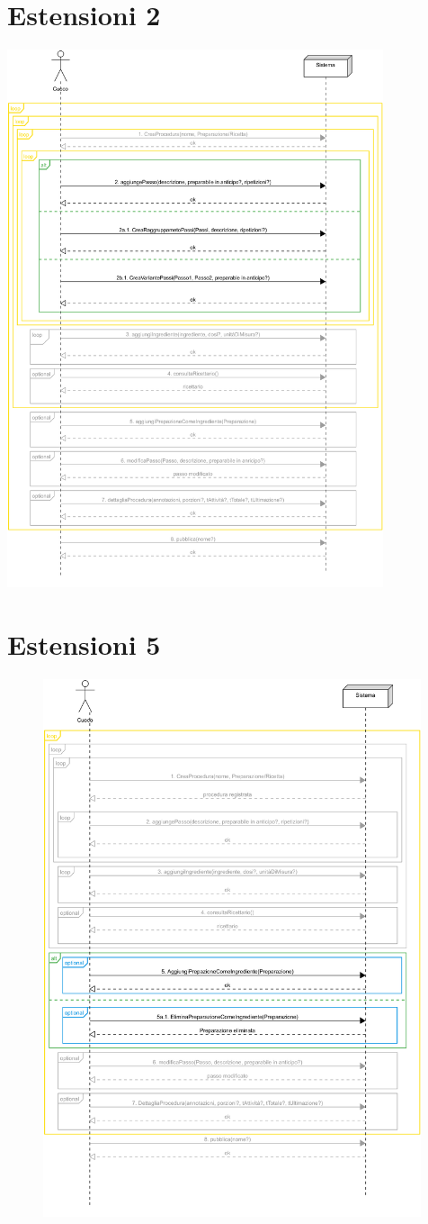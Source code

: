 \section*{Estensioni 2}
\includegraphics[max width=\textwidth, max height=158mm]{../resources/img/GRP/SSD/ext2.png}

\section*{Estensioni 5}
\begin{figure}[H]
    \centering\includegraphics[max width=\textwidth, max height=158mm]{../resources/img/GRP/SSD/ext5.png}
\end{figure}
\RaggedRight